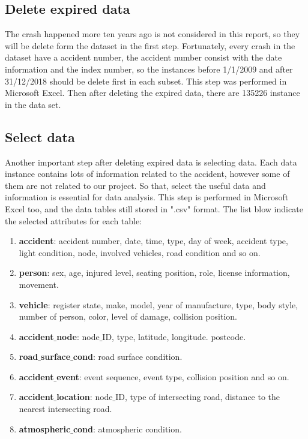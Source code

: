 \documentclass[11pt]{article}
\theoremstyle{definition}
\begin{document}
\subsection{Delete expired data}
The crash happened more ten years ago is not considered in this report, so they will be delete form the dataset in the first step. Fortunately, every crash in the dataset have a accident number, the accident number consist with the date information and the index number, so the instances before 1/1/2009 and after 31/12/2018 should be delete first in each subset.   This step was performed in Microsoft Excel. Then after deleting the expired data, there are 135226 instance in the data set.

\subsection{Select data}
Another important step after deleting expired data is selecting data. Each data instance contains lots of information related to the accident, however some of them are not related to our project. So that, select the useful data and information is essential for data analysis. This step is performed in Microsoft Excel too, and the data tables still stored in ".csv" format. The list blow indicate the selected attributes for each table:
\begin{enumerate}
	\item \textbf{accident}: accident number, date, time, type, day of week, accident type, light condition, node, involved vehicles, road condition and so on.
	\item \textbf{person}: sex, age, injured level, seating position, role, license information, movement. 
	\item \textbf{vehicle}: register state, make, model, year of manufacture, type, body style, number of person, color, level of damage, collision position. 
	\item \textbf{accident$\_$node}:	node$\_$ID, type, latitude, longitude. postcode.  
	\item \textbf{road$\_$surface$\_$cond}: road surface condition.
	\item \textbf{accident$\_$event}: event sequence, event type, collision position and so on.
	\item \textbf{accident$\_$location}:	 node$\_$ID, type of intersecting road, distance to the nearest intersecting road. 
	\item \textbf{atmospheric$\_$cond}:	atmospheric condition.
\end{enumerate}
\end{document}
